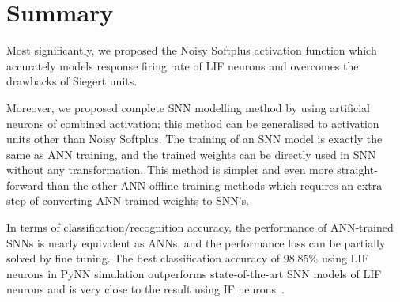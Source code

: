 \documentclass[runningheads,a4paper]{llncs}
\begin{document}
\section{Summary}
Most significantly, we proposed the Noisy Softplus activation function which accurately models response firing rate of LIF neurons and overcomes the drawbacks of Siegert units.
%		
%		
%		
%		

Moreover, we proposed complete SNN modelling method by using artificial neurons of combined activation;
this method can be generalised to activation units other than Noisy Softplus.
The training of an SNN model is exactly the same as ANN training, and the trained weights can be directly used in SNN without any transformation.
This method is simpler and even more straight-forward than the other ANN offline training methods which requires an extra step of converting ANN-trained weights to SNN's.

In terms of classification/recognition accuracy, the performance of ANN-trained SNNs is nearly equivalent as ANNs, and the performance loss can  be partially solved by fine tuning.
The best classification accuracy of 98.85\% using LIF neurons in PyNN simulation outperforms state-of-the-art SNN models of LIF neurons and is very close to the result using IF neurons~\cite{diehl2015fast}.
\end{document}
